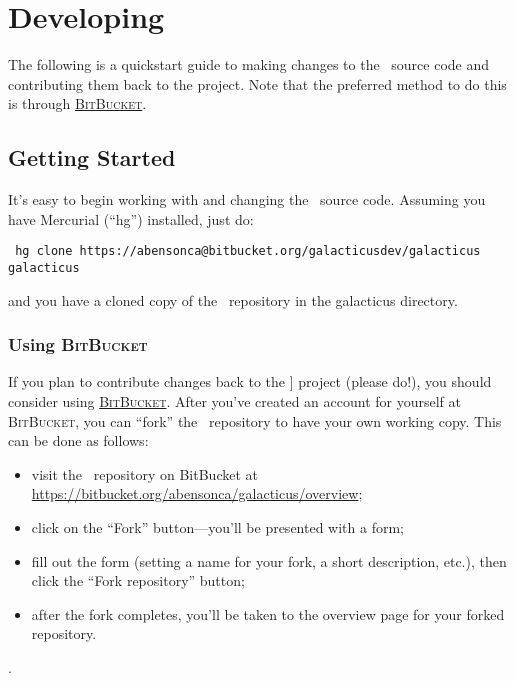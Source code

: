 \chapter{Developing \glc}

The following is a quickstart guide to making changes to the \glc\ source code and contributing them back to the project. Note that the preferred method to do this is through \href{https://bitbucket.org}{\normalfont \scshape BitBucket}.

\section{Getting Started}

It's easy to begin working with and changing the \glc\ source code. Assuming you have Mercurial (``{\normalfont \ttfamily hg}'') installed, just do:
\begin{verbatim}
 hg clone https://abensonca@bitbucket.org/galacticusdev/galacticus galacticus
\end{verbatim}
and you have a cloned copy of the \glc\ repository in the {\normalfont \ttfamily galacticus} directory.

\subsection{Using {\normalfont \scshape BitBucket}}

If you plan to contribute changes back to the \glc] project (please do!), you should consider using \href{https://bitbucket.org}{\normalfont \scshape BitBucket}. After you've created an account for yourself at {\normalfont \scshape BitBucket}, you can ``fork'' the \glc\ repository to have your own working copy. This can be done as follows:
\begin{itemize}
 \item visit the \glc\ repository on {\normalfont \ttfamily BitBucket} at \href{https://bitbucket.org/galacticusdev/galacticus/overview}{\normalfont \ttfamily https://bitbucket.org/abensonca/galacticus/overview};
 \item click on the ``Fork'' button---you'll be presented with a form;
 \item fill out the form (setting a name for your fork, a short description, etc.), then click the ``Fork repository'' button;
 \item after the fork completes, you'll be taken to the overview page for your forked repository.
\end{itemize}. 

